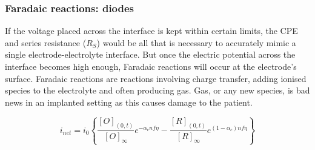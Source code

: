     \subsubsection{Faradaic reactions: diodes}
      If the voltage placed across the interface is kept within certain limits, the CPE and series resistance ($R_{S}$) would be all that is necessary to accurately mimic a single electrode-electrolyte interface.
      But once the electric potential across the interface becomes high enough, Faradaic reactions will occur at the electrode's surface.
      Faradaic reactions are reactions involving charge transfer, adding ionised species to the electrolyte and often producing gas.
      Gas, or any new species, is bad news in an implanted setting as this causes damage to the patient.

      \begin{equation}
        i_{net} = i_{0} \left\{ \frac{[O]_{(0,t)}}{[O]_{\infty}}e^{-\alpha_{c}nf\eta} - \frac{[R]_{(0,t)}}{[R]_{\infty}}e^{(1-\alpha_{c})nf\eta}\right\}
        \label{eqn:pt-2_butlerVolmerEquation}
      \end{equation}

